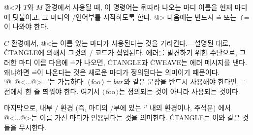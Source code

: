 \more \.{@<}가 $T$와 $M$ 환경에서 사용될 때, 이 명령어는 뒤따라 나오는
마디 이름을 현재 마디에 덧붙이고, 그 마디의 \CEE/언어부를 시작하도록 한다.
\.{@>} 다음에는 반드시 \.{=} 또는 \.{+=}이 나와야 한다.  

\more
$C$ 환경에서, \.{@<}는 이름 있는 마디가 사용된다는 것을
가리킨다.--- 설명된 대로, \.{CTANGLE}에 의해서
그것의 \CEE/ 코드가 삽입된다. 에러를 발견하기 위한
수단으로, 그러한 마디 이름 다음에 \.=가
나오면, \.{CTANGLE}과 \.{CWEAVE}는 에러 메시지를 낸다. 왜냐하면 \.=이
나온다는 것은 새로운 마디가 정의된다는 의미이기
때문이다. `\.{@\ @<...@>=}'는
가능하다. $\langle\,$foo$\,\rangle=\\{bar}$와 같은 문장을 반드시
사용해야 한다면, \.= 전에서 한 줄 띄워야 한다. 여기서
$\langle\,$foo$\,\rangle$는 정의되는 것이 아니라 사용되는 것이다.

\more
마지막으로, 내부 \CEE/ 환경 (즉, 마디의 \TEX/부에 있는 `\pb' 내의
환경이나, 주석문) 에서 \.{@<...@>}는 이름 가진 마디가 인용된다는 것을
의미한다. \.{CTANGLE}는 이와 같은 것들을 무시한다.

